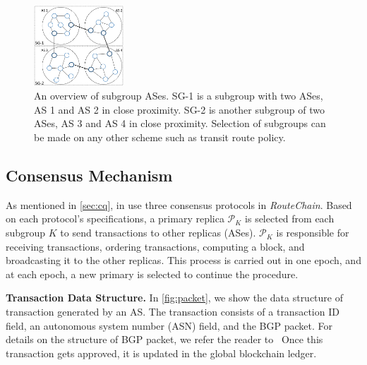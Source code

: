 \documentclass[5p]{elsarticle}
\newcommand{\BfPara}[1]{{\noindent\bf#1.}\xspace}
\newcommand{\rc}{{{\em RouteChain}}\xspace}
\begin{document}
\begin{figure}[t]
\begin{center}
\includegraphics[width=0.30\textwidth]{fig/ASes_SG.pdf}
\caption{An overview of subgroup ASes. SG-1 is a subgroup with two ASes, AS 1 and AS 2 in close proximity. SG-2 is another subgroup of two ASes, AS 3 and AS 4 in close proximity. Selection of subgroups can be made on any other scheme such as transit route policy.} 
\label{fig:ASes_SG}
\end{center}
\end{figure}




\subsection{Consensus Mechanism}\label{sec:consen}


As mentioned in \textsection\ref{sec:cq}, in use three consensus protocols in \rc. Based on each protocol's specifications, a primary replica $\mathcal{P}_{K}$ is selected from each subgroup $K$ to send transactions to other replicas (ASes). $\mathcal{P}_{K}$ is responsible for receiving transactions, ordering transactions, computing a block, and broadcasting it to the other replicas. This process is carried out in one epoch, and at each epoch, a new primary is selected to continue the procedure. 



\BfPara{Transaction Data Structure}\label{secc:tds}
In \autoref{fig:packet}, we show the data structure of transaction generated by an AS. The transaction consists of a transaction ID field, an autonomous system number (ASN) field, and the BGP packet. For details on the structure of BGP packet, we refer the reader to~\cite{rfc4271} Once this transaction gets approved, it is updated in the global blockchain ledger. 
\end{document}
